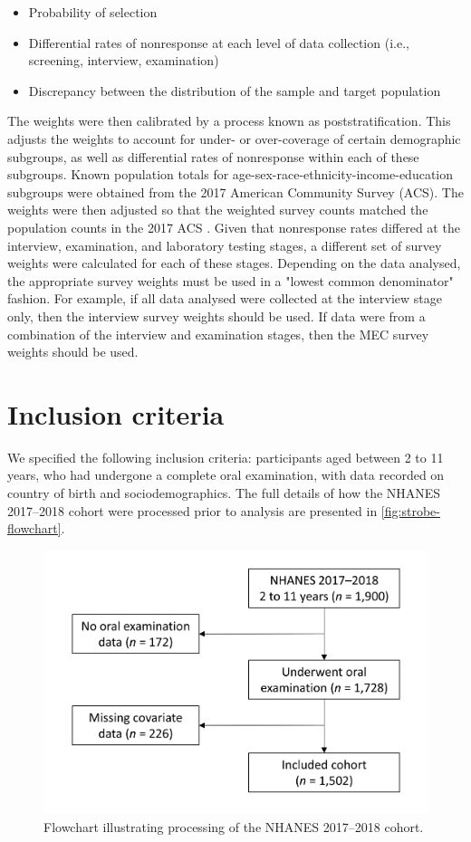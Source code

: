 \begin{itemize}
	\item Probability of selection
	\item Differential rates of nonresponse at each level of data collection (i.e., screening, interview, examination)
	\item Discrepancy between the distribution of the sample and target population
\end{itemize}

The weights were then calibrated by a process known as poststratification. This adjusts the weights to account for under- or over-coverage of certain demographic subgroups, as well as differential rates of nonresponse within each of these subgroups. Known population totals for age-sex-race-ethnicity-income-education subgroups were obtained from the 2017 American Community Survey (ACS). The weights were then adjusted so that the weighted survey counts matched the population counts in the 2017 ACS \citep{nhanesdesign}. Given that nonresponse rates differed at the interview, examination, and laboratory testing stages, a different set of survey weights were calculated for each of these stages. Depending on the data analysed, the appropriate survey weights must be used in a "lowest common denominator" fashion. For example, if all data analysed were collected at the interview stage only, then the interview survey weights should be used. If data were from a combination of the interview and examination stages, then the MEC survey weights should be used.

\section{Inclusion criteria}

We specified the following inclusion criteria: participants aged between 2 to 11 years, who had undergone a complete oral examination, with data recorded on country of birth and sociodemographics. The full details of how the NHANES 2017--2018 cohort were processed prior to analysis are presented in \autoref{fig:strobe-flowchart}.

\begin{figure}[ht]
\centering
\includegraphics[scale = 0.8]{images/strobe}
\caption{Flowchart illustrating processing of the NHANES 2017--2018 cohort.}
\label{fig:strobe-flowchart}
\end{figure}

